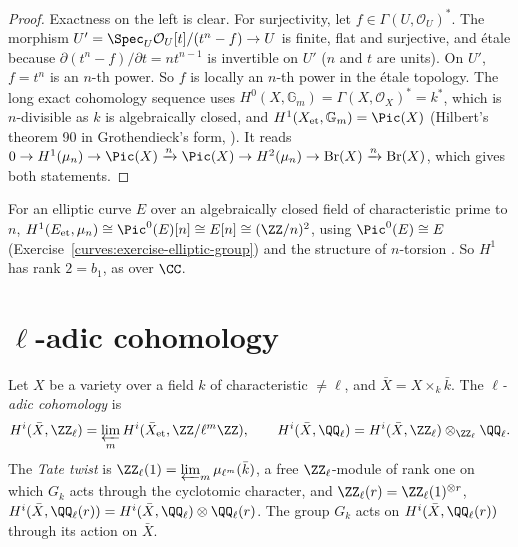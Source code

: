 \begin{proof}
Exactness on the left is clear. For surjectivity, let $f \in \Gamma(U, \mathcal{O}_U)^*$. The morphism $U' = \Spec_U\mathcal{O}_U[t]/(t^n - f) \to U$ is finite, flat and surjective, and
\'etale because $\partial(t^n - f)/\partial t = nt^{n-1}$ is invertible on $U'$ ($n$ and $t$ are units). On $U'$, $f = t^n$ is an $n$-th power. So $f$ is locally an $n$-th power in the \'etale
topology. The long exact cohomology sequence uses $H^0(X, \mathbb{G}_m) = \Gamma(X, \mathcal{O}_X)^* = k^*$, which is $n$-divisible as $k$ is algebraically closed, and
$H^1(X_{\mathrm{et}}, \mathbb{G}_m) = \Pic(X)$ (Hilbert's theorem 90 in Grothendieck's form, \cite[Chapter III]{milne-etale}). It reads
$0 \to H^1(\mu_n) \to \Pic(X) \xrightarrow{n} \Pic(X) \to H^2(\mu_n) \to \mathrm{Br}(X) \xrightarrow{n} \mathrm{Br}(X)$, which gives both statements.
\end{proof}

\begin{example}\label{etale-cohomology:example-kummer}
For an elliptic curve $E$ over an algebraically closed field of characteristic prime to $n$, $H^1(E_{\mathrm{et}}, \mu_n) \cong \Pic^0(E)[n] \cong E[n] \cong (\ZZ/n)^2$, using $\Pic^0(E) \cong E$
(Exercise~\ref{curves:exercise-elliptic-group}) and the structure of $n$-torsion \cite{mumford-abelian}. So $H^1$ has rank $2 = b_1$, as over $\CC$.
\end{example}

\section{$\ell$-adic cohomology}\label{etale-cohomology:section-l-adic}

\begin{definition}\label{etale-cohomology:definition-l-adic}
Let $X$ be a variety over a field $k$ of characteristic $\neq \ell$, and $\bar X = X \times_k\bar k$. The \emph{$\ell$-adic cohomology} is
\[
H^i(\bar X, \ZZ_\ell) = \varprojlim_mH^i(\bar X_{\mathrm{et}}, \ZZ/\ell^m\ZZ), \qquad H^i(\bar X, \QQ_\ell) = H^i(\bar X, \ZZ_\ell) \otimes_{\ZZ_\ell}\QQ_\ell .
\]
The \emph{Tate twist} is $\ZZ_\ell(1) = \varprojlim_m\mu_{\ell^m}(\bar k)$, a free $\ZZ_\ell$-module of rank one on which $G_k$ acts through the cyclotomic character, and
$\ZZ_\ell(r) = \ZZ_\ell(1)^{\otimes r}$, $H^i(\bar X, \QQ_\ell(r)) = H^i(\bar X, \QQ_\ell) \otimes \QQ_\ell(r)$. The group $G_k$ acts on $H^i(\bar X, \QQ_\ell(r))$ through its action on $\bar X$.
\end{definition}

